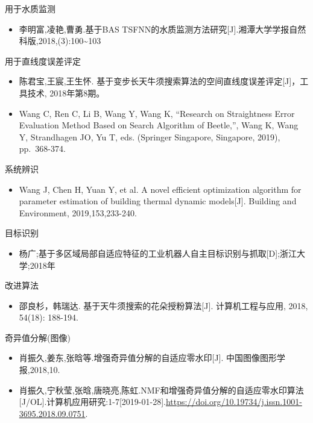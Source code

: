 \documentclass[]{ctexbook}
\providecommand{\tightlist}{%
  \setlength{\itemsep}{0pt}\setlength{\parskip}{0pt}}
\begin{document}
用于水质监测

\begin{itemize}
\tightlist
\item
  李明富,凌艳,曹勇.基于BAS
  TSFNN的水质监测方法研究{[}J{]}.湘潭大学学报自然科版,2018,(3):100\textasciitilde{}103
\end{itemize}

用于直线度误差评定

\begin{itemize}
\tightlist
\item
  陈君宝,王宸,王生怀.
  基于变步长天牛须搜索算法的空间直线度误差评定{[}J{]}，工具技术,
  2018年第8期。
\item
  Wang C, Ren C, Li B, Wang Y, Wang K, ``Research on Straightness Error
  Evaluation Method Based on Search Algorithm of Beetle,'', Wang K, Wang
  Y, Strandhagen JO, Yu T, eds. (Springer Singapore, Singapore, 2019),
  pp.~368-374.
\end{itemize}

系统辨识

\begin{itemize}
\tightlist
\item
  Wang J, Chen H, Yuan Y, et al. A novel efficient optimization
  algorithm for parameter estimation of building thermal dynamic
  models{[}J{]}. Building and Environment, 2019,153,233-240.
\end{itemize}

目标识别

\begin{itemize}
\tightlist
\item
  杨广;基于多区域局部自适应特征的工业机器人自主目标识别与抓取{[}D{]};浙江大学;2018年
\end{itemize}

改进算法

\begin{itemize}
\tightlist
\item
  邵良杉，韩瑞达. 基于天牛须搜索的花朵授粉算法{[}J{]}. 计算机工程与应用,
  2018, 54(18): 188-194.
\end{itemize}

奇异值分解(图像)

\begin{itemize}
\tightlist
\item
  肖振久,姜东,张晗等.增强奇异值分解的自适应零水印{[}J{]}.
  中国图像图形学报,2018,10.
\item
  肖振久,宁秋莹,张晗,唐晓亮,陈虹.NMF和增强奇异值分解的自适应零水印算法{[}J/OL{]}.计算机应用研究:1-7{[}2019-01-28{]}.\url{https://doi.org/10.19734/j.issn.1001-3695.2018.09.0751}.
\end{itemize}
\end{document}

